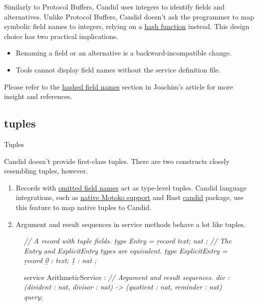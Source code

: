\documentclass{article}
\begin{document}
Similarly to Protocol Buffers, Candid uses integers to identify fields and alternatives.
Unlike Protocol Buffers, Candid doesn't ask the programmer to map symbolic field names to integers, relying on a \href{https://github.com/dfinity/candid/blob/master/spec/Candid.md#shorthand-symbolic-field-ids}{hash function} instead.
This design choice has two practical implications.

\begin{itemize}
    \item
    Renaming a field or an alternative is a backward-incompatible change.
    \item
    Tools cannot display field names without the service definition file.
\end{itemize}

Please refer to the \href{https://www.joachim-breitner.de/blog/786-A_Candid_explainer__Quirks#hashed-field-names}{hashed field names} section in Joachim's article for more insight and references.

\subsection{tuples}{Tuples}

Candid doesn't provide first-class tuples.
There are two constructs closely resembling tuples, however.

\begin{enumerate}
    \item
    Records with \href{https://github.com/dfinity/candid/blob/master/spec/Candid.md#shorthand-tuple-fields}{omitted field names} act as type-level tuples.
    Candid language integrations, such as \href{https://internetcomputer.org/docs/current/developer-docs/backend/candid/candid-howto#interact-with-a-service-from-a-motoko-canister}{native Motoko support} and Rust \href{https://crates.io/crates/candid}{candid} package, use this feature to map native tuples to Candid.
    \item
    Argument and result sequences in service methods behave a lot like tuples.
\end{enumerate}

\begin{figure}
\begin{code}[candid]
\em{// A record with tuple fields.}
\b{type} Entry  = \b{record} { text; nat };
\em{// The Entry and ExplicitEntry types are equivalent.}
\b{type} ExplicitEntry = \b{record} { \b{0} : text; \b{1} : nat };

service ArithmeticService : {
  \em{// Argument and result sequences.}
  div : (divident : nat, divisor : nat) -> (quotient : nat, reminder : nat) query;
}
\end{code}
\end{figure}
\end{document}
